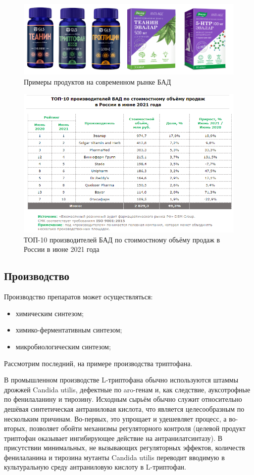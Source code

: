 \documentclass[11pt]{article}
\begin{document}
\begin{figure}[!htpb]
\centering
\includegraphics[scale=0.5]{products}
\caption{Примеры продуктов на современном рынке БАД}
\label{}
\end{figure}


\begin{figure}[!htpb]
\centering
\includegraphics[scale=0.5]{bad}
\caption{ТОП-10 производителей БАД по стоимостному объёму продаж в России в июне 2021 года ~\cite{dsm}}
\label{}
\end{figure}

\subsection{Производство}
Производство препаратов может осуществляться:
\begin{itemize} 
\item химическим синтезом; 
\item химико-ферментативным синтезом; 
\item микробиологическим синтезом;
\end{itemize} 

Рассмотрим последний, на примере производства триптофана. 

В промышленном производстве L-триптофана обычно используются штаммы дрожжей Candida utilis, дефектные по aro-генам и, как следствие, ауксотрофные по фенилаланину и тирозину. Исходным сырьём обычно служит относительно дешёвая синтетическая антраниловая кислота, что является целесообразным по нескольким причинам. Во-первых, это упрощает и удешевляет процесс, а во-вторых, позволяет обойти механизмы регуляторного контроля (целевой продукт триптофан оказывает ингибирующее действие на антранилатсинтазу). В присутствии минимальных, не вызывающих регуляторных эффектов, количеств фенилаланина и тирозина мутанты Candida utilis переводит вводимую в культуральную среду антраниловую кислоту в L-триптофан.
\end{document}
